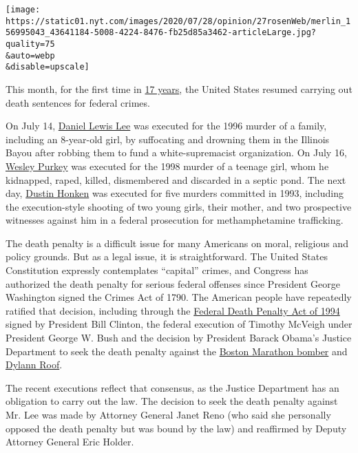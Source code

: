 \texttt{[image: https://static01.nyt.com/images/2020/07/28/opinion/27rosenWeb/merlin\_156995043\_43641184-5008-4224-8476-fb25d85a3462-articleLarge.jpg?quality=75\\\&auto=webp\\\&disable=upscale]}

This month, for the first time in
\href{https://www.nytimes.com/2020/07/14/us/politics/daniel-lewis-lee-execution-crime.html}{17
years}, the United States resumed carrying out death sentences for
federal crimes.

On July 14,
\href{https://www.nytimes.com/2020/07/14/us/politics/daniel-lewis-lee-execution-crime.html}{Daniel
Lewis Lee} was executed for the 1996 murder of a family, including an
8-year-old girl, by suffocating and drowning them in the Illinois Bayou
after robbing them to fund a white-supremacist organization. On July 16,
\href{https://www.nytimes.com/2020/07/16/us/politics/wesley-ira-purkey-executed.html}{Wesley
Purkey} was executed for the 1998 murder of a teenage girl, whom he
kidnapped, raped, killed, dismembered and discarded in a septic pond.
The next day,
\href{https://www.nytimes.com/2020/07/17/us/dustin-honken-federal-execution.html}{Dustin
Honken} was executed for five murders committed in 1993, including the
execution-style shooting of two young girls, their mother, and two
prospective witnesses against him in a federal prosecution for
methamphetamine trafficking.

The death penalty is a difficult issue for many Americans on moral,
religious and policy grounds. But as a legal issue, it is
straightforward. The United States Constitution expressly contemplates
``capital'' crimes, and Congress has authorized the death penalty for
serious federal offenses since President George Washington signed the
Crimes Act of 1790. The American people have repeatedly ratified that
decision, including through the
\href{https://www.justice.gov/archives/jm/criminal-resource-manual-69-federal-death-penalty-act-1994}{Federal
Death Penalty Act of 1994} signed by President Bill Clinton, the federal
execution of Timothy McVeigh under President George W. Bush and the
decision by President Barack Obama's Justice Department to seek the
death penalty against the
\href{https://www.wsj.com/articles/boston-marathon-bomber-appeals-death-penalty-11576152005}{Boston
Marathon bomber} and
\href{https://www.nbcnews.com/news/us-news/dylann-roof-appeals-death-penalty-south-carolina-church-massacre-n1125341}{Dylann
Roof}.

The recent executions reflect that consensus, as the Justice Department
has an obligation to carry out the law. The decision to seek the death
penalty against Mr. Lee was made by Attorney General Janet Reno (who
said she personally opposed the death penalty but was bound by the law)
and reaffirmed by Deputy Attorney General Eric Holder.

